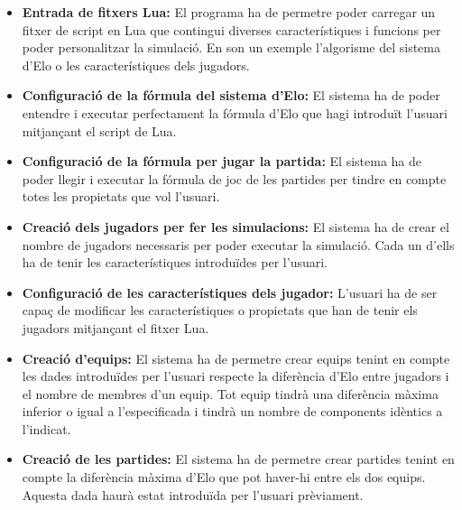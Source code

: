 \documentclass[a4paper]{article}
\begin{document}
\begin{itemize}
    \item \textbf{Entrada de fitxers Lua:} El programa ha de permetre poder carregar un fitxer de script en Lua que contingui diverses característiques i funcions per poder personalitzar la simulació. En son un exemple l'algorisme del sistema d'Elo o les característiques dels jugadors.
    
    \item \textbf{Configuració de la fórmula del sistema d'Elo:} El sistema ha de poder entendre i executar perfectament la fórmula d'Elo que hagi introduït l'usuari mitjançant el script de Lua. 
    
    \item \textbf{Configuració de la fórmula per jugar la partida:} El sistema ha de poder llegir i executar la fórmula de joc de les partides per tindre en compte totes les propietats que vol l'usuari.
    
    \item \textbf{Creació dels jugadors per fer les simulacions:} El sistema ha de crear el nombre de jugadors necessaris per poder executar la simulació. Cada un d'ells ha de tenir les característiques introduïdes per l'usuari.
    
    \item \textbf{Configuració de les característiques dels jugador:} L'usuari ha de ser capaç de modificar les característiques o propietats que han de tenir els jugadors mitjançant el fitxer Lua.
    
    \item \textbf{Creació d'equips:} El sistema ha de permetre crear equips tenint en compte les dades introduïdes per l'usuari respecte la diferència d'Elo entre jugadors i el nombre de membres d'un equip. Tot equip tindrà una diferència màxima inferior o igual a l'especificada i tindrà un nombre de components idèntics a l'indicat.
    
    \item \textbf{Creació de les partides:} El sistema ha de permetre crear partides tenint en compte la diferència màxima d'Elo que pot haver-hi entre els dos equips. Aquesta dada haurà estat introduïda per l'usuari prèviament.
    

    

\end{itemize}
\end{document}
